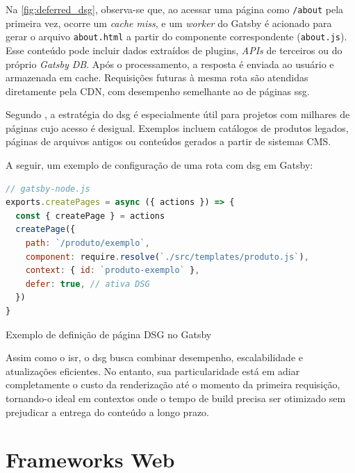 Na \autoref{fig:deferred_dsg}, observa-se que, ao acessar uma página como \texttt{/about} pela primeira vez, ocorre um \textit{cache miss}, e um \textit{worker} do Gatsby é acionado para gerar o arquivo \texttt{about.html} a partir do componente correspondente (\texttt{about.js}). Esse conteúdo pode incluir dados extraídos de plugins, \textit{APIs} de terceiros ou do próprio \textit{Gatsby DB}. Após o processamento, a resposta é enviada ao usuário e armazenada em cache. Requisições futuras à mesma rota são atendidas diretamente pela CDN, com desempenho semelhante ao de páginas \acrshort{ssg}.

Segundo , a estratégia do \acrshort{dsg} é especialmente útil para projetos com milhares de páginas cujo acesso é desigual. Exemplos incluem catálogos de produtos legados, páginas de arquivos antigos ou conteúdos gerados a partir de sistemas CMS.

A seguir, um exemplo de configuração de uma rota com \acrshort{dsg} em Gatsby:

\begin{codigo}[H]
  \begin{lstlisting}[language=JavaScript]
// gatsby-node.js
exports.createPages = async ({ actions }) => {
  const { createPage } = actions
  createPage({
    path: `/produto/exemplo`,
    component: require.resolve(`./src/templates/produto.js`),
    context: { id: `produto-exemplo` },
    defer: true, // ativa DSG
  })
}
  \end{lstlisting}
  \caption{Exemplo de definição de página DSG no Gatsby}
  \label{cod:dsg_example}
\end{codigo}

Assim como o \acrshort{isr}, o \acrshort{dsg} busca combinar desempenho, escalabilidade e atualizações eficientes. No entanto, sua particularidade está em adiar completamente o custo da renderização até o momento da primeira requisição, tornando-o ideal em contextos onde o tempo de build precisa ser otimizado sem prejudicar a entrega do conteúdo a longo prazo.























\section{Frameworks Web}
\label{sec:frameworks-web}

